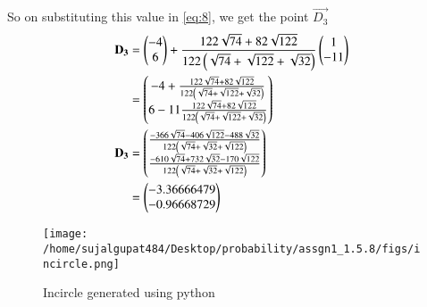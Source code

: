 \documentclass[journal,12pt,twocolumn]{IEEEtran}
\theoremstyle{remark}
\begin{document}
So on substituting this value in \eqref{eq:8}, we get the point $\vec{D_{3}}$ 
\begin{align}
\mathbf{D_{3}} &=\begin{pmatrix}-4\\6\end{pmatrix} + \frac{122\sqrt{74}+82\sqrt{122}}{122\left(\sqrt{74}+\sqrt{122}+\sqrt{32}\right)}\begin{pmatrix}1\\-11\end{pmatrix}\\
&=\begin{pmatrix}-4+\frac{122\sqrt{74}+82\sqrt{122}}{122\left(\sqrt{74}+\sqrt{122}+\sqrt{32}\right)}\\6-11\frac{122\sqrt{74}+82\sqrt{122}}{122\left(\sqrt{74}+\sqrt{122}+\sqrt{32}\right)}\end{pmatrix}\\
\mathbf{D_{3}} &=\begin{pmatrix}{\frac{-366\sqrt{74}-406\sqrt{122}-488\sqrt{32}}{122\ensuremath{\left(\sqrt{74}+\sqrt{32}+\sqrt{122}\right)}}}\\{\frac{-610\sqrt{74}+732\sqrt{32}-170\sqrt{122}}{122\left(\sqrt{74}+\sqrt{32}+\sqrt{122}\right)}}\end{pmatrix}\\
&=\begin{pmatrix}-3.36666479\\-0.96668729\end{pmatrix}
\end{align}

\begin{figure}
\centering
\texttt{[image: /home/sujalgupat484/Desktop/probability/assgn1\_1.5.8/figs/incircle.png]}
\caption{Incircle generated using python}
\label{fig:Incircle_py}
\end{figure}
\end{document}
